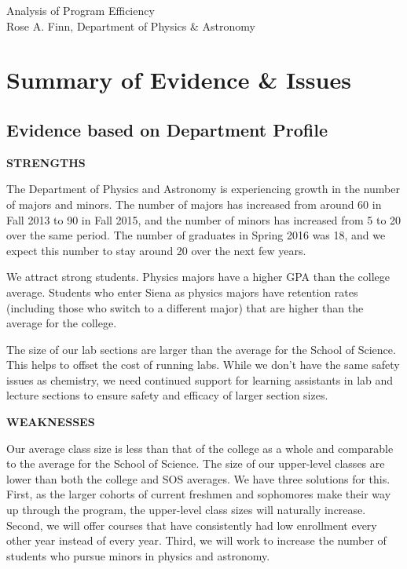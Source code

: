 \documentclass[12pt]{article}
\begin{document}
\begin{center}
{\large
Analysis of Program Efficiency\\ 
 Rose A. Finn, %
Department of Physics \& Astronomy \\ }
\end{center}


\section{Summary of Evidence \& Issues}
\vspace*{-.2in}
\subsection{Evidence based on Department Profile}
{\bf STRENGTHS}

The Department of Physics and Astronomy is experiencing growth in the number of majors and minors.  The number of majors has increased from around 60 in Fall 2013 to 90 in Fall 2015, and the number of minors has increased from 5 to 20 over the same period.  The number of graduates in Spring 2016 was 18, and we expect this number to stay around 20 over the next few years.

We attract strong students.  Physics majors have a higher GPA than the college average. Students who enter Siena as physics majors have retention rates (including those who switch to a different major) that are higher than the average for the college.  

The size of our lab sections are larger than the average for the School of Science.  This helps to offset the cost of running labs.  While we don't have the same safety issues as chemistry, we need continued support for learning assistants in lab and lecture sections to ensure safety and efficacy of larger section sizes.

{\bf WEAKNESSES}

Our average class size is less than that of the college as a whole and comparable to the average for the School of Science.   The size of our upper-level classes are lower than both the college and SOS averages.  We have three solutions for this.  First, as the larger cohorts of current freshmen and sophomores make their way up through the program, the upper-level class sizes will naturally increase.  Second, we will offer courses that have consistently had low enrollment every other year instead of every year.  Third, we will work to increase the number of students who pursue minors in physics and astronomy.  
\end{document}
